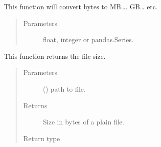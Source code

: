\documentclass[letterpaper,10pt,english]{sphinxmanual}
\begin{document}
\begin{fulllineitems}
\label{\detokenize{_autosummary/graphdb_builder:graphdb_builder.builder_utils.convert_bytes}}
This function will convert bytes to MB…. GB… etc.
\begin{quote}\begin{description}
\item[{Parameters}] \leavevmode
{} \textendash{} float, integer or pandas.Series.

\end{description}\end{quote}

\end{fulllineitems}


\begin{fulllineitems}
\label{\detokenize{_autosummary/graphdb_builder:graphdb_builder.builder_utils.copytree}}
\end{fulllineitems}


\begin{fulllineitems}
\label{\detokenize{_autosummary/graphdb_builder:graphdb_builder.builder_utils.file_size}}
This function returns the file size.
\begin{quote}\begin{description}
\item[{Parameters}] \leavevmode
{} () \textendash{} path to file.

\item[{Returns}] \leavevmode
Size in bytes of a plain file.

\item[{Return type}] \leavevmode
{}

\end{description}\end{quote}

\end{fulllineitems}
\end{document}
